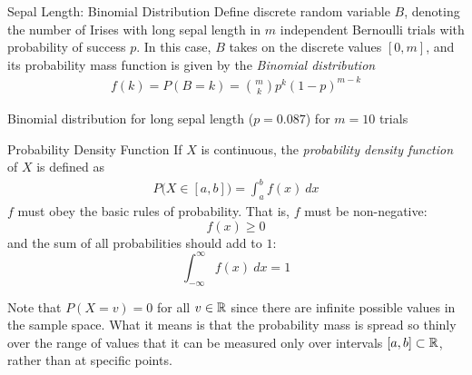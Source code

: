 \begin{frame}{Sepal Length: Binomial Distribution}
Define discrete random variable $B$, denoting the
    number of Irises with long sepal length in $m$ independent
    Bernoulli trials with probability of success $p$.
    In this case, $B$ takes on the discrete values $[0,m]$,
    and its probability mass
    function is given by the {\em Binomial
    distribution}
    \begin{align*}
        f(k) = P(B=k) = {m \choose k} p^k (1-p)^{m-k}
    \end{align*}
 
	Binomial distribution for long sepal length ($p=0.087$) for $m=10$
	trials

	\bigskip
    \centerline{
	}
\end{frame}

\begin{frame}{Probability Density Function}
If $X$ is
continuous, the {\em probability density function} of $X$ is
def\/{i}ned as
\begin{align*}
    P\bigl(X \in [a,b]\bigr) = \int_a^b f(x)\ dx
\end{align*}
$f$ must obey the basic rules of probability.
That is, $f$ must be non-negative:
$$f(x) \ge 0$$
and the sum of all
probabilities should add to $1$:
$$\int_{-\infty}^\infty f(x)\ dx = 1$$

\bigskip Note that $P(X=v) = 0$ for all $v \in {\mathord{\mathbb R}}$ since there are
infinite possible values in the sample space. What it means is
that the probability mass is spread so thinly over the range of
values that it can be measured only over intervals $[a,b] \subset
{\mathord{\mathbb R}}$, rather than at specif\/{i}c points.
\end{frame}



